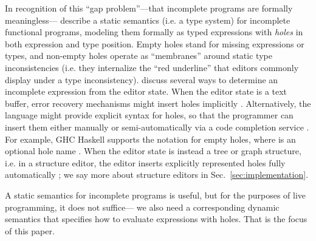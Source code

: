 In recognition of this ``{gap problem}''---that incomplete programs are formally meaningless---\citet{popl-paper} describe a static semantics (i.e. a type system) for incomplete 
functional programs, modeling them formally as typed expressions with \emph{holes} in 
both expression and type position. 
Empty holes stand for missing expressions or types,
and non-empty holes operate as ``membranes'' around static type inconsistencies 
(i.e. they internalize the ``red underline'' that editors commonly display under a type inconsistency).
\citet{HazelnutSNAPL} discuss several ways to determine an incomplete expression from the editor state. When the editor state is a text buffer, error recovery mechanisms might insert holes implicitly \cite{DBLP:journals/siamcomp/AhoP72,charles1991practical,graham1979practical,DBLP:conf/oopsla/KatsJNV09}. Alternatively, the language might provide explicit syntax for holes, so that the programmer can insert them either manually  
or semi-automatically via a code completion service \cite{Amorim2016}. For example, GHC Haskell supports the notation  for empty holes, where  is an optional hole name \cite{GHCHoles}. When the editor state is instead a tree or graph structure, i.e. in a structure editor, the editor inserts explicitly represented holes fully automatically \cite{popl-paper}; we say more about structure editors in Sec.~\ref{sec:implementation}.

%
A static semantics for incomplete programs is useful, but for the purposes of live programming, it does not suffice---%
we also need a corresponding dynamic semantics that specifies how to evaluate expressions with holes. That is the focus of this paper. %
%


